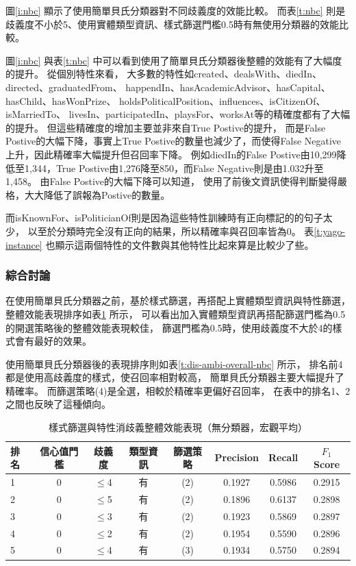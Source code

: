 圖\ref{i:nbc} 顯示了使用簡單貝氏分類器對不同歧義度的效能比較。
而表\ref{t:nbc} 則是歧義度不小於5、使用實體類型資訊、樣式篩選門檻0.5時有無使用分類器的效能比較。

圖\ref{i:nbc} 與表\ref{t:nbc} 中可以看到使用了簡單貝氏分類器後整體的效能有了大幅度的提升。
從個別特性來看，
大多數的特性如created、dealsWith、diedIn、directed、graduatedFrom、
happendIn、hasAcademicAdvisor、hasCapital、hasChild、hasWonPrize、
holdsPoliticalPosition、influences、isCitizenOf、isMarriedTo、
livesIn、participatedIn、playsFor、worksAt等的精確度都有了大幅的提升。
但這些精確度的增加主要並非來自True Postive的提升，
而是False Postive的大幅下降，事實上True Postive的數量也減少了，而使得False Negative上升，因此精確率大幅提升但召回率下降。
例如diedIn的False Postive由10,299降低至1,344，True Postive由1,276降至850，而False Negative則是由1.032升至1,458。
由False Postive的大幅下降可以知道，
使用了前後文資訊使得判斷變得嚴格，大大降低了誤報為Postive的數量。

而isKnownFor、isPoliticianOf則是因為這些特性訓練時有正向標記的的句子太少，
以至於分類時完全沒有正向的結果，所以精確率與召回率皆為0。
表\ref{t:yago-instance} 也顯示這兩個特性的文件數與其他特性比起來算是比較少了些。

\subsubsection{綜合討論}
在使用簡單貝氏分類器之前，基於樣式篩選，再搭配上實體類型資訊與特性篩選，
整體效能表現排序如表\ref{t:dis-ambi-overall-no-nbc} 所示，
可以看出加入實體類型資訊再搭配篩選門檻為0.5的開選策略後的整體效能表現較佳，
篩選門檻為0.5時，使用歧義度不大於4的樣式會有最好的效果。

使用簡單貝氏分類器後的表現排序則如表\ref{t:dis-ambi-overall-nbc} 所示，
排名前4都是使用高歧義度的樣式，使召回率相對較高，
簡單貝氏分類器主要大幅提升了精確率。
而篩選策略(4)是全選，相較於精確率更偏好召回率，
在表中的排名1、2之間也反映了這種傾向。

\begin{table}
    \caption{樣式篩選與特性消歧義整體效能表現（無分類器，宏觀平均）}
    \label{t:dis-ambi-overall-no-nbc}
    \footnotesize
    \begin{center}
        \begin{tabular}{|l||c|c||c|c||c|c|c|}
            \hline
            排名 & 信心值門檻 & 歧義度 & 類型資訊 & 篩選策略 & Precision & Recall & $F_1$ Score \\
            \hline
            1 & 0 & $\leq$4 & 有 & (2) & 0.1927 & 0.5986 & 0.2915 \\
            2 & 0 & $\leq$5 & 有 & (2) & 0.1896 & 0.6137 & 0.2898 \\
            3 & 0 & $\leq$3 & 有 & (2) & 0.1923 & 0.5869 & 0.2897 \\
            4 & 0 & $\leq$2 & 有 & (2) & 0.1954 & 0.5590 & 0.2896 \\
            5 & 0 & $\leq$4 & 有 & (3) & 0.1934 & 0.5750 & 0.2894 \\
            \hline
        \end{tabular}
    \end{center}
\end{table}

